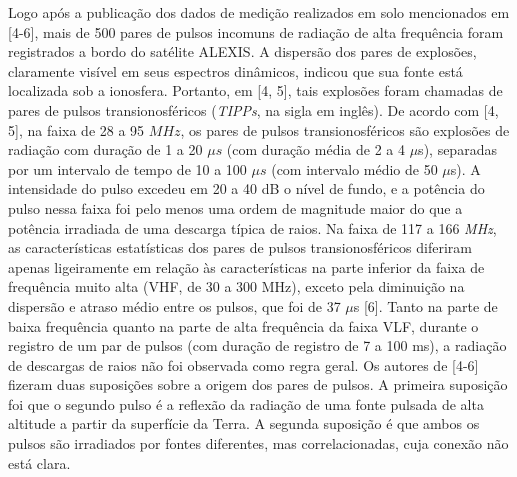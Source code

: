 \documentclass[a4paper, 12pt, onecolumn,singlespacing]{article}
\begin{document}
	Logo após a publicação dos dados de medição realizados em solo mencionados em [4-6], mais de 500 pares de pulsos incomuns de radiação de alta frequência foram registrados a bordo do satélite ALEXIS. A dispersão dos pares de explosões, claramente visível em seus espectros dinâmicos, indicou que sua fonte está localizada sob a ionosfera. Portanto, em [4, 5], tais explosões foram chamadas de pares de pulsos transionosféricos (\textit{TIPPs}, na sigla em inglês). De acordo com [4, 5], na faixa de 28 a 95 $MHz$, os pares de pulsos transionosféricos são explosões de radiação com duração de 1 a 20 $\mu s$ (com duração média de 2 a 4 $\mu$s), separadas por um intervalo de tempo de 10 a 100 $\mu s$ (com intervalo médio de 50 $\mu$s). A intensidade do pulso excedeu em 20 a 40 dB o nível de fundo, e a potência do pulso nessa faixa foi pelo menos uma ordem de magnitude maior do que a potência irradiada de uma descarga típica de raios. Na faixa de 117 a 166 \textit{MHz}, as características estatísticas dos pares de pulsos transionosféricos diferiram apenas ligeiramente em relação às características na parte inferior da faixa de frequência muito alta (VHF, de 30 a 300 MHz), exceto pela diminuição na dispersão e atraso médio entre os pulsos, que foi de 37 $\mu$s [6]. Tanto na parte de baixa frequência quanto na parte de alta frequência da faixa VLF, durante o registro de um par de pulsos (com duração de registro de 7 a 100 ms), a radiação de descargas de raios não foi observada como regra geral. Os autores de [4-6] fizeram duas suposições sobre a origem dos pares de pulsos. A primeira suposição foi que o segundo pulso é a reflexão da radiação de uma fonte pulsada de alta altitude a partir da superfície da Terra. A segunda suposição é que ambos os pulsos são irradiados por fontes diferentes, mas correlacionadas, cuja conexão não está clara.
	
\end{document}
